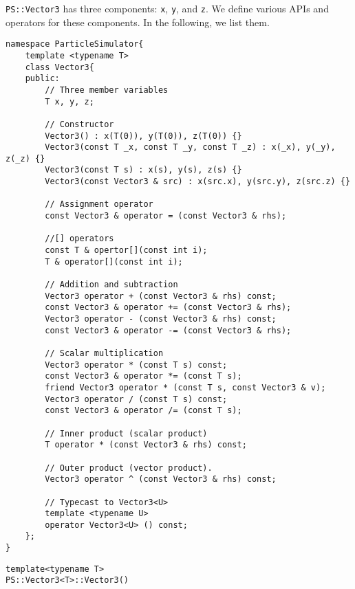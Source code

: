 \texttt{PS::Vector3} has three components: \texttt{x}, \texttt{y}, and \texttt{z}. We define various APIs
and operators for these components. In the following, we list them.
\begin{lstlisting}[caption=Vector3]
namespace ParticleSimulator{
    template <typename T>
    class Vector3{
    public:
        // Three member variables
        T x, y, z;

        // Constructor
        Vector3() : x(T(0)), y(T(0)), z(T(0)) {}
        Vector3(const T _x, const T _y, const T _z) : x(_x), y(_y), z(_z) {}
        Vector3(const T s) : x(s), y(s), z(s) {}
        Vector3(const Vector3 & src) : x(src.x), y(src.y), z(src.z) {}

        // Assignment operator
        const Vector3 & operator = (const Vector3 & rhs);

        //[] operators
        const T & opertor[](const int i);
        T & operator[](const int i);

        // Addition and subtraction
        Vector3 operator + (const Vector3 & rhs) const;
        const Vector3 & operator += (const Vector3 & rhs);
        Vector3 operator - (const Vector3 & rhs) const;
        const Vector3 & operator -= (const Vector3 & rhs);

        // Scalar multiplication
        Vector3 operator * (const T s) const;
        const Vector3 & operator *= (const T s);
        friend Vector3 operator * (const T s, const Vector3 & v);
        Vector3 operator / (const T s) const;
        const Vector3 & operator /= (const T s);

        // Inner product (scalar product)
        T operator * (const Vector3 & rhs) const;

        // Outer product (vector product).
        Vector3 operator ^ (const Vector3 & rhs) const;

        // Typecast to Vector3<U>
        template <typename U>
        operator Vector3<U> () const;
    };
}
\end{lstlisting}
\mbox{}
\begin{screen}
\begin{verbatim}
template<typename T>
PS::Vector3<T>::Vector3()
\end{verbatim}
\end{screen}

